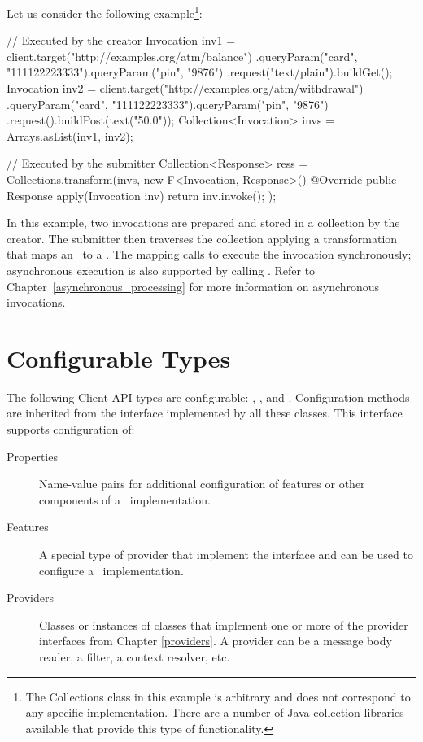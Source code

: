  Let us consider the following example\footnote{The Collections class in this example is arbitrary and does not correspond to any specific implementation. There are a number of Java collection libraries available that provide this type of functionality.}:

\begin{listing}{1}
// Executed by the creator
Invocation inv1 = client.target("http://examples.org/atm/balance")
    .queryParam("card", "111122223333").queryParam("pin", "9876")
    .request("text/plain").buildGet();
Invocation inv2 = client.target("http://examples.org/atm/withdrawal")
    .queryParam("card", "111122223333").queryParam("pin", "9876")
    .request().buildPost(text("50.0"));
Collection<Invocation> invs = Arrays.asList(inv1, inv2);

// Executed by the submitter
Collection<Response> ress =
    Collections.transform(invs,
        new F<Invocation, Response>() {
             @Override
             public Response apply(Invocation inv) {
                 return inv.invoke(); } });
\end{listing}

In this example, two invocations are prepared and stored in a collection by the creator. The submitter then traverses the collection applying a transformation that maps an \Invocation\ to a \Response. The mapping calls  to execute the invocation synchronously; asynchronous execution is also supported by calling . Refer to
Chapter~\ref{asynchronous_processing} for more information on asynchronous invocations.

\section{Configurable Types}
\label{configurable_types}

The following Client API types are configurable: \Client, \ClientBuilder, and \WebTarget. Configuration methods are inherited from the  interface implemented by all these classes. This interface supports configuration of:

\begin{description}
\item [Properties] Name-value pairs for additional configuration of features or other components of a \jaxrs\ implementation.
\item [Features] A special type of provider that implement the  interface and can be used to configure a \jaxrs\ implementation.
\item [Providers] Classes or instances of classes that implement one or more of the provider interfaces from Chapter \ref{providers}. A provider can be a message body reader, a filter, a context resolver, etc. 
\end{description}

